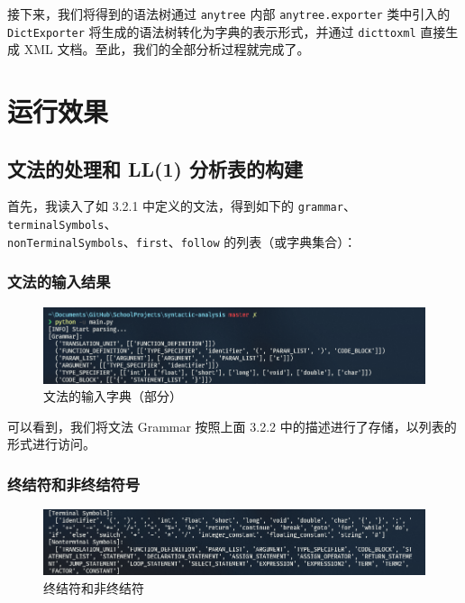 \documentclass[UTF8]{ctexart}
\begin{document}
接下来，我们将得到的语法树通过 \texttt{anytree} 内部 \texttt{anytree.exporter} 类中引入的\\
\texttt{DictExporter} 将生成的语法树转化为字典的表示形式，并通过 \texttt{dicttoxml} 直接生成 XML 文档。至此，我们的全部分析过程就完成了。

\section{运行效果}
\subsection{文法的处理和 LL(1) 分析表的构建}
首先，我读入了如 3.2.1 中定义的文法，得到如下的 \texttt{grammar}、\texttt{terminalSymbols}、\\
\texttt{nonTerminalSymbols}、\texttt{first}、\texttt{follow} 的列表（或字典集合）：

\subsubsection{文法的输入结果}

\begin{figure}[H]
  \includegraphics[width=\linewidth]{images/grammar.png}
  \caption{文法的输入字典（部分）}
  \label{fig:figure2}
\end{figure}

可以看到，我们将文法 Grammar 按照上面 3.2.2 中的描述进行了存储，以列表的形式进行访问。

\subsubsection{终结符和非终结符号}

\begin{figure}[H]
  \includegraphics[width=\linewidth]{images/term_non.png}
  \caption{终结符和非终结符}
  \label{fig:figure3}
\end{figure}
\end{document}
